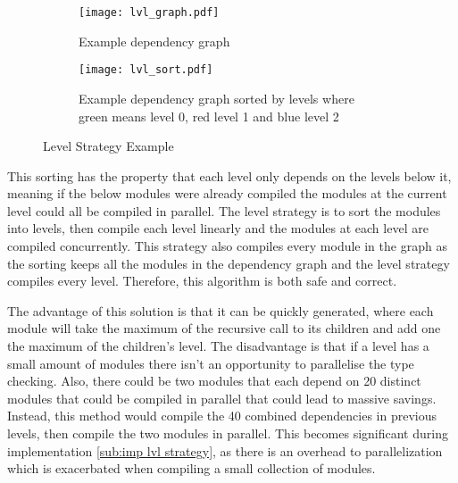 \begin{figure}[H]
  \begin{subfigure}[t]{0.45\textwidth}
    \centering
    \texttt{[image: lvl\_graph.pdf]}
    \caption{Example dependency graph}
    \label{fig:example lvl dep graph}
  \end{subfigure} \hfill
  \begin{subfigure}[t]{0.45\textwidth}
    \centering
    \texttt{[image: lvl\_sort.pdf]}
    \caption{Example dependency graph sorted by levels where green means level
    0, red level 1 and blue level 2}
    \label{fig:example lvl sort}
  \end{subfigure}
  \caption{Level Strategy Example}
  \label{subfig: lvl strat}
\end{figure}

This sorting has the property that each level only depends on the levels
below it, meaning if the below modules were already compiled the modules at the
current level could all be compiled in parallel. The level strategy is to sort
the modules into levels, then compile each level linearly and the modules at
each level are compiled concurrently. This strategy also compiles every module
in the graph as the sorting keeps all the modules in the dependency graph and
the level strategy compiles every level. Therefore, this algorithm is both safe
and correct.

The advantage of this solution is that it can be quickly generated,
where each module will take the maximum of the recursive call to its children
and add one the maximum of the children's level. The disadvantage is that if a
level has a small amount of modules there isn't an opportunity to
parallelise the type checking. Also, there could be two modules that each
depend  on 20 distinct modules that could be compiled in parallel that could
lead to massive savings. Instead, this method would compile the 40 combined
dependencies in previous levels, then compile the two modules in parallel. This
becomes significant during implementation \cref{sub:imp lvl strategy}, as there
is an overhead to parallelization which is exacerbated when compiling a small
collection of modules.




